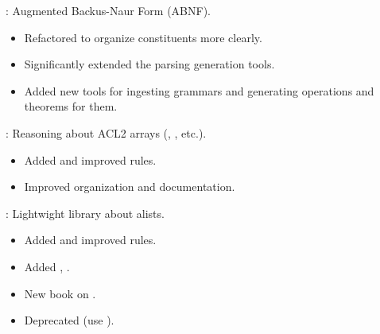 \begin{frame}

\implibtitle

:
Augmented Backus-Naur Form (ABNF).
\begin{itemize}
\item Refactored to organize constituents more clearly.
\item Significantly extended the parsing generation tools.
\item Added new tools for ingesting grammars
      and generating operations and theorems for them.
\end{itemize}

\end{frame}


\begin{frame}

\implibtitle

:
Reasoning about ACL2 arrays (, , etc.).
\begin{itemize}
\item Added and improved rules.
\item Improved organization and documentation.
\end{itemize}

\end{frame}


\begin{frame}

\implibtitle

:
Lightwight library about alists.
\begin{itemize}
\item Added and improved rules.
\item Added , .
\item New book on .
\item Deprecated  (use ).
\end{itemize}

\end{frame}


